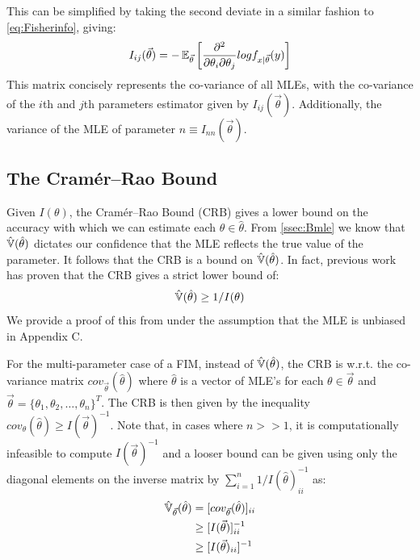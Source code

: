 \noindent This can be simplified by taking the second deviate in a similar fashion to \cref{eq:Fisherinfo}, giving:
\begin{equation*}
    I_{ij}(\vec{\theta})= -\operatorname{\mathbb{E}}_{\vec{\theta}}\left[
    \frac{\partial^2}{\partial \theta_i \partial \theta_j} log f_{x|\vec{\theta}}(y)\right]
\end{equation*}
This matrix concisely represents the co-variance of all MLEs, with the co-variance of the $i$th and $j$th parameters estimator given by $I_{ij}(\vec{\theta})$. Additionally, the variance of the MLE of parameter $n\equiv I_{nn}(\vec{\theta})$.

\subsection{The Cramér–Rao Bound}
\label{ssec:Bcrb}

Given $I(\theta)$, the Cramér–Rao Bound (CRB) gives a lower bound on the accuracy with which we can estimate each $\theta\in\hat\theta$. From \cref{ssec:Bmle} we know that $\operatorname{\hat{\mathbb{V}}}(\hat\theta)$ dictates our confidence that the MLE reflects the true value of the parameter. It follows that the CRB is a bound on $\operatorname{\hat{\mathbb{V}}}(\hat\theta)$. In fact, previous work has proven that the CRB gives a strict lower bound of:
\begin{equation*}
    \operatorname{\hat{\mathbb{V}}}(\hat\theta) \geq 1/I(\theta)
\end{equation*}
\noindent We provide a proof of this from \cite{trees_detection_2013} under the assumption that the MLE is unbiased in Appendix C.\par
For the multi-parameter case of a FIM, instead of $\operatorname{\hat{\mathbb{V}}}(\hat\theta)$, the CRB is w.r.t. the co-variance matrix $cov_{\vec{\theta}}(\hat\theta)$ where $\hat\theta$ is a vector of MLE's for each $\theta\in\vec{\theta}$ and $\vec{\theta}=\{\theta_1,\theta_2,\ldots,\theta_n\}^T$. The CRB is then given by the inequality $cov_\theta(\hat\theta)\geq I(\vec{\theta})^{-1}$. Note that, in cases where $n>>1$, it is computationally infeasible to compute $I(\vec{\theta})^{-1}$ and a looser bound can be given using only the diagonal elements on the inverse matrix by $\sum_{i=1}^n 1/I(\hat\theta)_{ii}^{-1}$ as:
\begin{align*}
    \operatorname{\hat{\mathbb{V}}}_{\vec{\theta}}(\hat\theta) &= [cov_{\vec{\theta}}(\hat\theta)]_{ii}\\
    &\geq [I(\vec{\theta})]^{-1}_{ii}\\
    &\geq [I(\vec{\theta})_{ii}]^{-1}
\end{align*}

